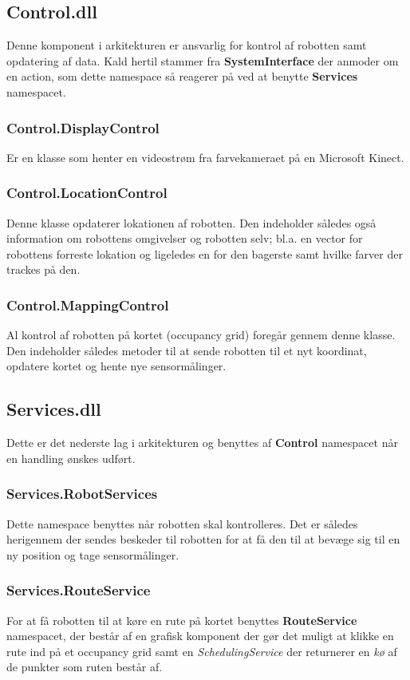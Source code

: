 \subsection{Control.dll}\label{arkitektur:control}
Denne komponent i arkitekturen er ansvarlig for kontrol af robotten samt opdatering af data.
Kald hertil stammer fra \textbf{SystemInterface} der anmoder om en action, som dette namespace så reagerer på ved at benytte \textbf{Services} namespacet.

\subsubsection{Control.DisplayControl}
Er en klasse som henter en videostrøm fra farvekameraet på en Microsoft Kinect.

\subsubsection{Control.LocationControl}
Denne klasse opdaterer lokationen af robotten.
Den indeholder således også information om robottens omgivelser og robotten selv; bl.a. en vector for robottens forreste lokation og ligeledes en for den bagerste samt hvilke farver der trackes på den.

\subsubsection{Control.MappingControl}
Al kontrol af robotten på kortet (occupancy grid) foregår gennem denne klasse.
Den indeholder således metoder til at sende robotten til et nyt koordinat, opdatere kortet og hente nye sensormålinger.

\subsection{Services.dll}\label{arkitektur:services}
Dette er det nederste lag i arkitekturen og benyttes af \textbf{Control} namespacet når en handling ønskes udført.

\subsubsection{Services.RobotServices}
Dette namespace benyttes når robotten skal kontrolleres.
Det er således herigennem der sendes beskeder til robotten for at få den til at bevæge sig til en ny position og tage sensormålinger.

\subsubsection{Services.RouteService}
For at få robotten til at køre en rute på kortet benyttes \textbf{RouteService} namespacet, der består af en grafisk komponent der gør det muligt at klikke en rute ind på et occupancy grid samt en \textit{SchedulingService} der returnerer en \textit{kø} af de punkter som ruten består af.

